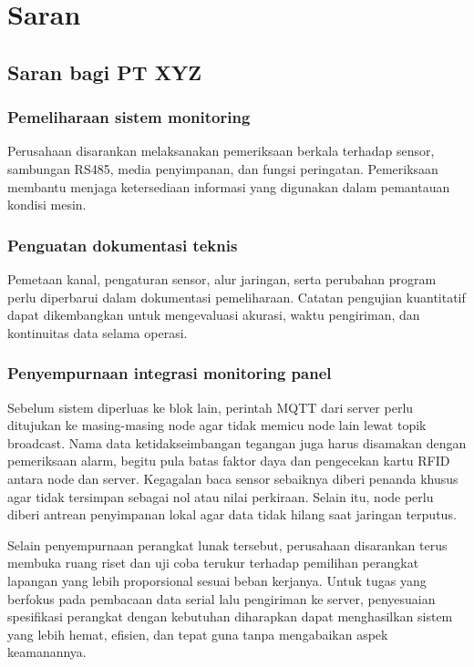 \section{Saran}

\subsection{Saran bagi PT XYZ}

\subsubsection{Pemeliharaan sistem monitoring}

Perusahaan disarankan melaksanakan pemeriksaan berkala terhadap sensor, sambungan RS485, media penyimpanan, dan fungsi peringatan. Pemeriksaan membantu menjaga ketersediaan informasi yang digunakan dalam pemantauan kondisi mesin.

\subsubsection{Penguatan dokumentasi teknis}

Pemetaan kanal, pengaturan sensor, alur jaringan, serta perubahan program perlu diperbarui dalam dokumentasi pemeliharaan. Catatan pengujian kuantitatif dapat dikembangkan untuk mengevaluasi akurasi, waktu pengiriman, dan kontinuitas data selama operasi.

\subsubsection{Penyempurnaan integrasi monitoring panel}

Sebelum sistem diperluas ke blok lain, perintah MQTT dari server perlu ditujukan ke masing-masing node agar tidak memicu node lain lewat topik broadcast. Nama data ketidakseimbangan tegangan juga harus disamakan dengan pemeriksaan alarm, begitu pula batas faktor daya dan pengecekan kartu RFID antara node dan server. Kegagalan baca sensor sebaiknya diberi penanda khusus agar tidak tersimpan sebagai nol atau nilai perkiraan. Selain itu, node perlu diberi antrean penyimpanan lokal agar data tidak hilang saat jaringan terputus.

Selain penyempurnaan perangkat lunak tersebut, perusahaan disarankan terus membuka ruang riset dan uji coba terukur terhadap pemilihan perangkat lapangan yang lebih proporsional sesuai beban kerjanya. Untuk tugas yang berfokus pada pembacaan data serial lalu pengiriman ke server, penyesuaian spesifikasi perangkat dengan kebutuhan diharapkan dapat menghasilkan sistem yang lebih hemat, efisien, dan tepat guna tanpa mengabaikan aspek keamanannya.

